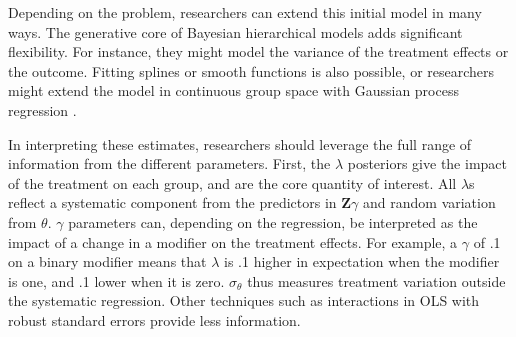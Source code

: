 \documentclass[12pt]{article}
\begin{document}
Depending on the problem, researchers can extend this initial model in many ways.
The generative core of Bayesian hierarchical models adds significant flexibility.
For instance, they might model the variance of the treatment effects or the outcome. 
Fitting splines or smooth functions is also possible, or researchers might extend the model in continuous group space with Gaussian process regression \citep{Pratietal2023}.


In interpreting these estimates, researchers should leverage the full range of information from the different parameters. 
First, the $\lambda$ posteriors give the impact of the treatment on each group, and are the core quantity of interest. 
All $\lambda$s reflect a systematic component from the predictors in $\textbf{Z}\gamma$ and random variation from $\theta$. 
$\gamma$ parameters can, depending on the regression, be interpreted as the impact of a change in a modifier on the treatment effects.
For example, a $\gamma$ of .1 on a binary modifier means that $\lambda$ is .1 higher in expectation when the modifier is one, and .1 lower when it is zero.
$\sigma_\theta$ thus measures treatment variation outside the systematic regression. 
Other techniques such as interactions in OLS with robust standard errors provide less information.
\end{document}
